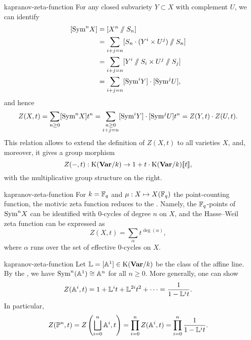 \begin{example}{kapranov-zeta-function}
    For any closed subvariety $Y \subset X$ with complement $U$, we can identify
    \[ \begin{aligned}
        [\textup{Sym}^n X]
            &= [X^n \sslash S_n] \\
            &= \sum_{i + j = n} [S_n \cdot (Y^i \times U^j) \sslash S_n] \\
            &= \sum_{i + j = n} [Y^i \sslash S_i \times U^j \sslash S_j] \\
            &= \sum_{i + j = n} [ \textup{Sym}^i Y] \cdot [ \textup{Sym}^j U ] ,
    \end{aligned} \]
    and hence
    \[ Z(X, t) = \sum_{n \ge 0} [\textup{Sym}^n X] t^n = \sum_{\substack{n \ge 0 \\ i + j = n}} [\textup{Sym}^i Y] \cdot [\textup{Sym}^j U] t^n = Z(Y, t) \cdot Z(U, t) . \]
    This relation allows to extend the definition of $Z(X, t)$ to all varieties $X$, and, moreover, it gives a group morphism
    \[ Z(-, t) : \textup{K}(\textbf{Var}/k) \to 1 + t \cdot \textup{K}(\textbf{Var}/k) \llbracket t \rrbracket , \]
    with the multiplicative group structure on the right.
\end{example}

\begin{example}{kapranov-zeta-function}
    For $k = \FF_q$ and $\mu : X \mapsto X(\FF_q)$ the point-counting function, the motivic zeta function reduces to the . Namely, the $\FF_q$-points of $\textup{Sym}^n X$ can be identified with $0$-cycles of degree $n$ on $X$, and the Hasse--Weil zeta function can be expressed as
    \[ Z(X, t) = \sum_{\alpha} t^{\deg(\alpha)} , \]
    where $\alpha$ runs over the set of effective $0$-cycles on $X$.
\end{example}

\begin{example}{kapranov-zeta-function}
    Let $\mathbb{L} = [\AA^1] \in \textup{K}(\textbf{Var}/k)$ be the class of the affine line. By the , we have $\operatorname{Sym}^n(\AA^1) \isom \AA^n$ for all $n \ge 0$. More generally, one can show
    \[ Z(\AA^i, t) = 1 + \mathbb{L}^i t + \mathbb{L}^{2i} t^2 + \cdots = \frac{1}{1 - \mathbb{L}^i t} . \]
    In particular,
    \[ Z(\PP^n, t) = Z\left(\bigsqcup_{i = 0}^{n} \AA^i , t\right) = \prod_{i = 0}^{n} Z(\AA^i, t) = \prod_{i = 0}^{n} \frac{1}{1 - \mathbb{L}^i t} . \]
\end{example}

